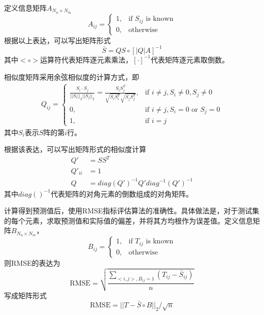 \documentclass[a4paper,12pt]{article}
\begin{document}
    定义信息矩阵$A_{N_u\times N_m}$
    \begin{equation}
      A_{ij}=\begin{cases}
      1, & \text{if } S_{ij} \text{ is known}\\
      0, & \text{otherwise}
    \end{cases}
    \end{equation}
    根据以上表达，可以写出矩阵形式
    \begin{equation}
      \bar S = QS\circ [|Q|A]^{-1}
    \end{equation}
    其中$<\circ>$运算符代表矩阵逐元素乘法，$[\cdot]^{-1}$代表矩阵逐元素取倒数。

    相似度矩阵采用余弦相似度的计算方式，即
    \begin{equation}
      \begin{aligned}
        Q_{ij} =
        \begin{cases}
          \frac{S_i\cdot S_j}{||S_i||_2 ||S_j||_2} = \frac{S_i S_j^T}{\sqrt{S_i S_i^T} \sqrt{S_j S_j^T}},& \text{if } i\neq j, S_i\neq 0, S_j\neq 0\\
          0, & \text{if } i\neq j, S_i=0 \text{ or } S_j=0\\
          1, & \text{if } i= j
        \end{cases}
      \end{aligned}
    \end{equation}
    其中$S_i$表示$S$阵的第$i$行。

    根据该表达，可以写出矩阵形式的相似度计算
    \begin{equation}
      \begin{aligned}
        Q' &= SS^T\\
        Q'_{ii} &= 1\\
        Q &= diag(Q')^{-1}Q'diag^{-1}(Q')^{-1}
      \end{aligned}
    \end{equation}
    其中$diag()^{-1}$代表矩阵的对角元素的倒数组成的对角矩阵。

    计算得到预测值后，使用RMSE指标评估算法的准确性。具体做法是，对于测试集的每个元素，求取预测值和实际值的偏差，并将其方均根作为误差值。定义信息矩阵$B_{N_u\times N_m}$，
    \begin{equation}
      B_{ij}=\begin{cases}
      1, & \text{if } T_{ij} \text{ is known}\\
      0, & \text{otherwise}
    \end{cases}
    \end{equation}
    则RMSE的表达为
    \begin{equation}
      \text{RMSE}=\sqrt{\frac{\sum\limits_{<i,j>,B_{ij}=1} (T_{ij} - \bar S_{ij})}{n}}
    \end{equation}
    写成矩阵形式
    \begin{equation}
      \text{RMSE}=||T - \bar S\circ B||_2/\sqrt{n}
    \end{equation}
\end{document}
